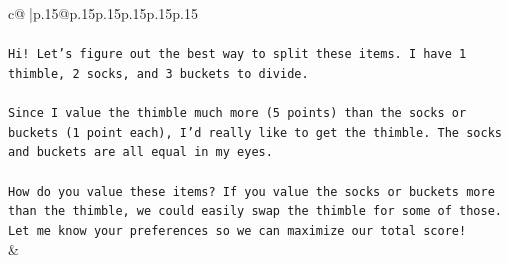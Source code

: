 \documentclass{article}
\begin{document}
{\begin{supertabular}{c@{$\;$}|p{.15\linewidth}@{}p{.15\linewidth}p{.15\linewidth}p{.15\linewidth}p{.15\linewidth}p{.15\linewidth}}
{{{\\ 
\\ 
\texttt{Hi! Let's figure out the best way to split these items. I have 1 thimble, 2 socks, and 3 buckets to divide.} \\
\\ 
\texttt{Since I value the thimble much more (5 points) than the socks or buckets (1 point each), I'd really like to get the thimble. The socks and buckets are all equal in my eyes.} \\
\\ 
\texttt{How do you value these items? If you value the socks or buckets more than the thimble, we could easily swap the thimble for some of those. Let me know your preferences so we can maximize our total score!} \\
            }
        }
    }
    & \\ \\


\end{supertabular}}
\end{document}
